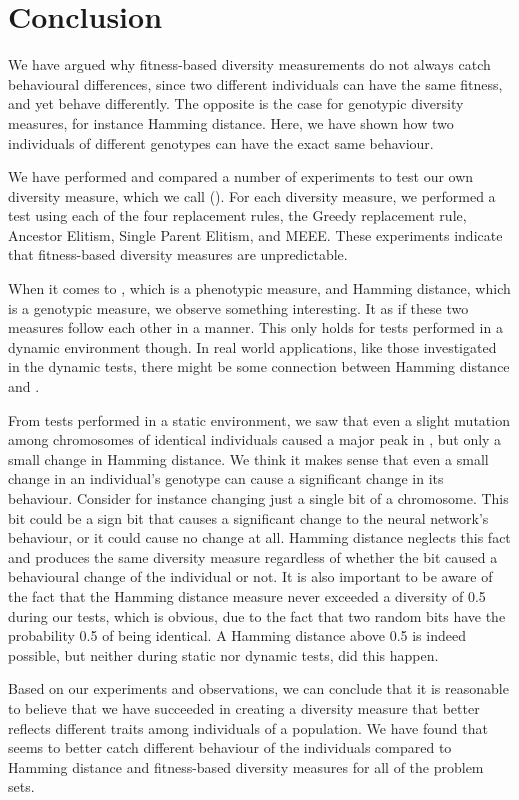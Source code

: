 \section{Conclusion}\label{sec:conclusion}
We have argued why fitness-based diversity measurements do not always catch behavioural differences, since two different individuals can have the same fitness, and yet behave differently.
The opposite is the case for genotypic diversity measures, for instance Hamming distance.
Here, we have shown how two individuals of different genotypes can have the exact same behaviour.

We have performed and compared a number of experiments to test our own diversity measure, which we call \di{} (\dia{}).
For each diversity measure, we performed a test using each of the four replacement rules, the Greedy replacement rule, Ancestor Elitism, Single Parent Elitism, and MEEE\@.
These experiments indicate that fitness-based diversity measures are unpredictable.

When it comes to \dia{}, which is a phenotypic measure, and Hamming distance, which is a genotypic measure, we observe something interesting. It as if these two measures follow each other in a manner.
This only holds for tests performed in a dynamic environment though. 
In real world applications, like those investigated in the dynamic tests, there might be some connection between Hamming distance and \dia{}.

From tests performed in a static environment, we saw that even a slight mutation among chromosomes of identical individuals caused a major peak in \dia{}, but only a small change in Hamming distance.
We think it makes sense that even a small change in an individual's genotype can cause a significant change in its behaviour. Consider for instance changing just a single bit of a chromosome. This bit could be a sign bit that causes a significant change to the neural network's behaviour, or it could cause no change at all.
Hamming distance neglects this fact and produces the same diversity measure regardless of whether the bit caused a behavioural change of the individual or not.
It is also important to be aware of the fact that the Hamming distance measure never exceeded a diversity of \num{0.5} during our tests, which is obvious, due to the fact that two random bits have the probability \num{0.5} of being identical.
A Hamming distance above \num{0.5} is indeed possible, but neither during static nor dynamic tests, did this happen. 

Based on our experiments and observations, we can conclude that it is reasonable to believe that we have succeeded in creating a diversity measure that better reflects different traits among individuals of a population. We have found that \dia{} seems to better catch different behaviour of the individuals compared to Hamming distance and fitness-based diversity measures for all of the problem sets.

